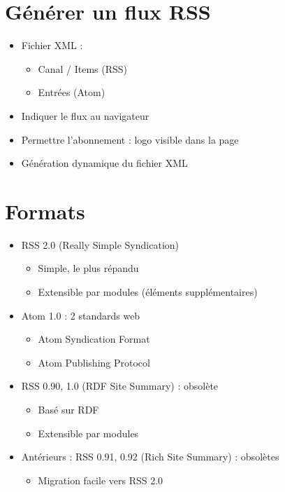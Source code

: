 \hypertarget{guxe9nuxe9rer-un-flux-rss}{%
\section{Générer un flux RSS}\label{guxe9nuxe9rer-un-flux-rss}}

\begin{itemize}
\tightlist
\item
  Fichier XML :

  \begin{itemize}
  \tightlist
  \item
    Canal / Items (RSS)
  \item
    Entrées (Atom)
  \end{itemize}
\item
  Indiquer le flux au navigateur
\item
  Permettre l'abonnement : logo visible dans la page
\item
  Génération dynamique du fichier XML
\end{itemize}

\hypertarget{formats}{%
\section{Formats}\label{formats}}

\begin{itemize}
\tightlist
\item
  RSS 2.0 (Really Simple Syndication)

  \begin{itemize}
  \tightlist
  \item
    Simple, le plus répandu
  \item
    Extensible par modules (éléments supplémentaires)
  \end{itemize}
\item
  Atom 1.0 : 2 standards web

  \begin{itemize}
  \tightlist
  \item
    Atom Syndication Format
  \item
    Atom Publishing Protocol
  \end{itemize}
\item
  RSS 0.90, 1.0 (RDF Site Summary) : obsolète

  \begin{itemize}
  \tightlist
  \item
    Basé sur RDF
  \item
    Extensible par modules
  \end{itemize}
\item
  Antérieurs : RSS 0.91, 0.92 (Rich Site Summary) : obsolètes

  \begin{itemize}
  \tightlist
  \item
    Migration facile vers RSS 2.0
  \end{itemize}
\end{itemize}

